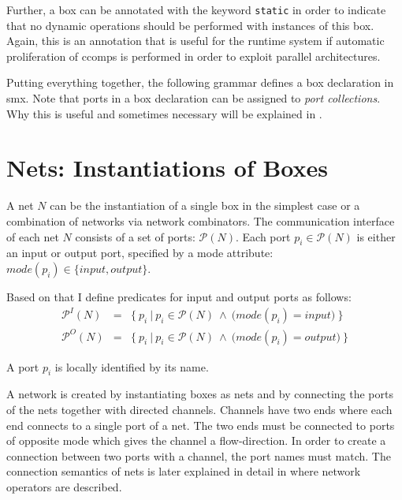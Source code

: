 Further, a box can be annotated with the keyword \texttt{static} in order to indicate that no dynamic operations should be performed with instances of this box.
Again, this is an annotation that is useful for the runtime system if automatic proliferation of \glspl*{ccomp} is performed in order to exploit parallel architectures.

Putting everything together, the following grammar defines a box declaration in \gls*{smx}.
Note that ports in a box declaration can be assigned to \emph{port collections}.
Why this is useful and sometimes necessary will be explained in \Sect{\ref{sect_smx_nets}}.



\section{Nets: Instantiations of Boxes}
\label{sect_smx_nets}
A net $N$ can be the instantiation of a single box in the simplest case or a combination of networks via network combinators.
The communication interface of each net $N$ consists of a set of ports: $\mathcal{P}(N)$.
Each port $p_i \in \mathcal{P}(N)$ is either an input or output port, specified by a mode attribute: $mode(p_i) \in \{ input, output \}$.

Based on that I define predicates for input and output ports as follows:
\begin{eqnarray}
    \label{eq_smx_port_in}
    \mathcal{P}^I(N) &=& \{\ p_i\ |\ p_i \in \mathcal{P}(N)\ \land\ \big ( mode( p_i ) = input \big )\ \} \\
    \label{eq_smx_port_out}
    \mathcal{P}^O(N) &=& \{\ p_i\ |\ p_i \in \mathcal{P}(N)\ \land\ \big ( mode( p_i ) = output \big )\ \}
\end{eqnarray}

A port $p_i$ is locally identified by its name.

A network is created by instantiating boxes as nets and by connecting the ports of the nets together with directed channels.
Channels have two ends where each end connects to a single port of a net.
The two ends must be connected to ports of opposite mode which gives the channel a flow-direction.
In order to create a connection between two ports with a channel, the port names must match.
The connection semantics of nets is later explained in detail in \Sect{\ref{sect_smx_network}} where network operators are described.

